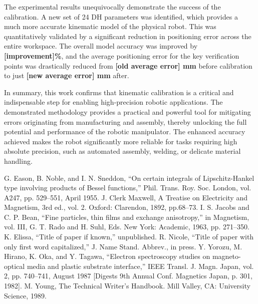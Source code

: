 \documentclass[conference]{IEEEtran}
\begin{document}
The experimental results unequivocally demonstrate the success of the calibration. A new set of 24 DH parameters was identified, which provides a much more accurate kinematic model of the physical robot. This was quantitatively validated by a significant reduction in positioning error across the entire workspace. The overall model accuracy was improved by \textbf{[improvement]\%}, and the average positioning error for the key verification points was drastically reduced from \textbf{[old average error] mm} before calibration to just \textbf{[new average error] mm} after.

In summary, this work confirms that kinematic calibration is a critical and indispensable step for enabling high-precision robotic applications. The demonstrated methodology provides a practical and powerful tool for mitigating errors originating from manufacturing and assembly, thereby unlocking the full potential and performance of the robotic manipulator. The enhanced accuracy achieved makes the robot significantly more reliable for tasks requiring high absolute precision, such as automated assembly, welding, or delicate material handling.





\begin{thebibliography}{00}
 G. Eason, B. Noble, and I. N. Sneddon, ``On certain integrals of Lipschitz-Hankel type involving products of Bessel functions,'' Phil. Trans. Roy. Soc. London, vol. A247, pp. 529--551, April 1955.
 J. Clerk Maxwell, A Treatise on Electricity and Magnetism, 3rd ed., vol. 2. Oxford: Clarendon, 1892, pp.68--73.
 I. S. Jacobs and C. P. Bean, ``Fine particles, thin films and exchange anisotropy,'' in Magnetism, vol. III, G. T. Rado and H. Suhl, Eds. New York: Academic, 1963, pp. 271--350.
 K. Elissa, ``Title of paper if known,'' unpublished.
 R. Nicole, ``Title of paper with only first word capitalized,'' J. Name Stand. Abbrev., in press.
 Y. Yorozu, M. Hirano, K. Oka, and Y. Tagawa, ``Electron spectroscopy studies on magneto-optical media and plastic substrate interface,'' IEEE Transl. J. Magn. Japan, vol. 2, pp. 740--741, August 1987 [Digests 9th Annual Conf. Magnetics Japan, p. 301, 1982].
 M. Young, The Technical Writer's Handbook. Mill Valley, CA: University Science, 1989.
\end{thebibliography}
\vspace{12pt}
\end{document}
